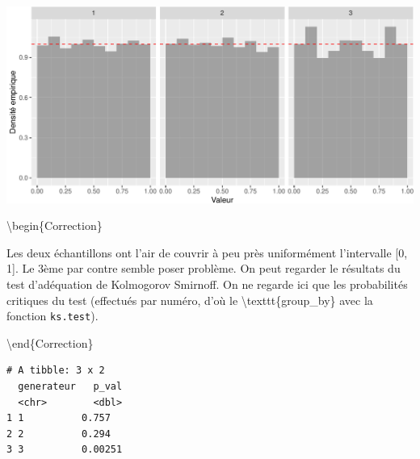 \documentclass[]{article}
\newenvironment{Shaded}{\begin{snugshade}}{\end{snugshade}}
\newcommand{\CommentTok}[1]{\textcolor[rgb]{0.56,0.35,0.01}{\textit{#1}}}
\newcommand{\DataTypeTok}[1]{\textcolor[rgb]{0.13,0.29,0.53}{#1}}
\newcommand{\KeywordTok}[1]{\textcolor[rgb]{0.13,0.29,0.53}{\textbf{#1}}}
\newcommand{\NormalTok}[1]{#1}
\newcommand{\OperatorTok}[1]{\textcolor[rgb]{0.81,0.36,0.00}{\textbf{#1}}}
\newcommand{\StringTok}[1]{\textcolor[rgb]{0.31,0.60,0.02}{#1}}
\begin{document}
\begin{center}\includegraphics{correction_simulation_variables_aleatoires_files/figure-latex/histogramme1-1} \end{center}

\textbackslash{}begin\{Correction\}

Les deux échantillons ont l'air de couvrir à peu près uniformément
l'intervalle {[}0, 1{]}. Le 3ème par contre semble poser problème. On
peut regarder le résultats du test d'adéquation de Kolmogorov Smirnoff.
On ne regarde ici que les probabilités critiques du test (effectués par
numéro, d'où le \textbackslash{}texttt\{group\_by\} avec la fonction
\texttt{ks.test}).

\textbackslash{}end\{Correction\}

\begin{Shaded}
\end{Shaded}

\begin{verbatim}
# A tibble: 3 x 2
  generateur   p_val
  <chr>        <dbl>
1 1          0.757  
2 2          0.294  
3 3          0.00251
\end{verbatim}
\end{document}
